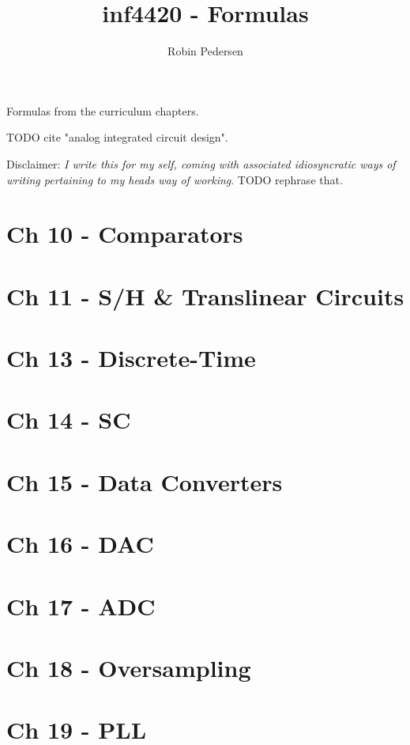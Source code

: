 \documentclass[a4paper,twocolumn]{article}
\begin{document}
  \title{inf4420 - Formulas}
  \author{Robin Pedersen}
  \maketitle

  Formulas from the curriculum chapters.

  TODO cite "analog integrated circuit design".

  Disclaimer: \emph{I write this for my self, coming with associated
  idiosyncratic ways of writing pertaining to my heads way of working}.
  TODO rephrase that.

  \section{Ch 10 - Comparators}
  \section{Ch 11 - S/H \& Translinear Circuits}
  \section{Ch 13 - Discrete-Time}
  \section{Ch 14 - SC}
  \section{Ch 15 - Data Converters}
  \section{Ch 16 - DAC}
  \section{Ch 17 - ADC}
  \section{Ch 18 - Oversampling}
  \section{Ch 19 - PLL}
\end{document}
